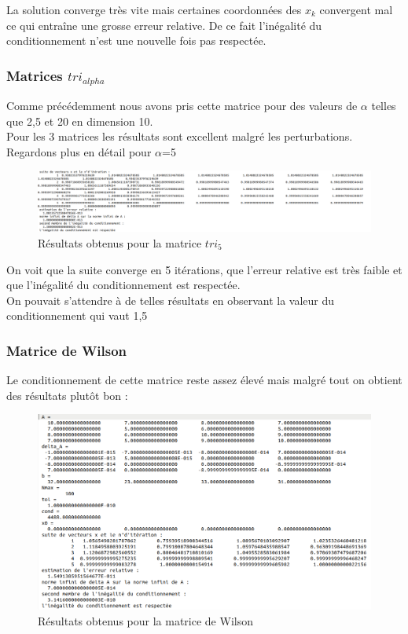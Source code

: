 \documentclass[12,french]{report}
\begin{document}
La solution converge très vite mais certaines coordonnées des $x_{k}$ convergent mal ce qui entraîne une grosse erreur relative. De ce fait l'inégalité du conditionnement n'est une nouvelle fois pas respectée.

\subsubsection{Matrices $tri_{alpha}$}

Comme précédemment nous avons pris cette matrice pour des valeurs de $\alpha$ telles que 2,5 et 20 en dimension 10.\\
Pour les 3 matrices les résultats sont excellent malgré les perturbations.\\
Regardons plus en détail pour $\alpha$=5

\begin{figure}[H]
	\centering
	\includegraphics[width=1\textwidth]{./Images/tri_5_1.res}
	\caption{Résultats obtenus pour la matrice $tri_{5}$}
\end{figure}

On voit que la suite converge en 5 itérations, que l'erreur relative est très faible et que l'inégalité du conditionnement est respectée.\\
On pouvait s'attendre à de telles résultats en observant la valeur du conditionnement qui vaut 1,5

\subsubsection{Matrice de Wilson}

Le conditionnement de cette matrice reste assez élevé mais malgré tout on obtient des résultats plutôt bon :\\

\begin{figure}[H]
	\centering
	\includegraphics[width=1\textwidth]{./Images/W_1.res}
	\caption{Résultats obtenus pour la matrice de Wilson}
\end{figure}
\end{document}
